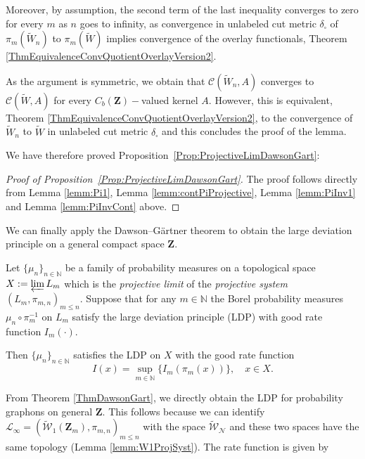 \documentclass[12pt,twoside,a4paper]{article}
\def\N{\mathbb{N}}
\newcommand{\Space}{\mathbf{Z}}
\newcommand{\CbFunct}{C_b(\Space)}
\newcommand{\UGraphon}{\widetilde{\mathcal{W}}_1}
\begin{document}
Moreover, by assumption, the second term of the last inequality converges to zero for every $m$ as $n$ goes to infinity, as convergence in unlabeled cut metric $\delta_{\square}$ of $\pi_m(\widetilde{W}_n)$ to $\pi_m(\widetilde{W})$ implies convergence of the overlay functionals, Theorem \ref{ThmEquivalenceConvQuotientOverlayVersion2}. 

As the argument is symmetric, we obtain that $\mathcal{C}(\widetilde{W}_n,A)$ converges to $\mathcal{C}(\widetilde{W},A)$ for every $\CbFunct-$valued kernel $A.$ However, this is equivalent, Theorem \ref{ThmEquivalenceConvQuotientOverlayVersion2}, to the convergence of $\widetilde{W}_n$ to $\widetilde{W}$ in unlabeled cut metric $\delta_{\square}$ and this concludes the proof of the lemma.
\endproof

We have therefore proved Proposition~\ref{Prop:ProjectiveLimDawsonGart}:

\begin{proof}[Proof of Proposition~\ref{Prop:ProjectiveLimDawsonGart}]
The proof follows directly from Lemma \ref{lemm:Pi1}, Lemma \ref{lemm:contPiProjective}, Lemma \ref{lemm:PiInv1} and Lemma \ref{lemm:PiInvCont} above.
\end{proof}

We can finally apply the Dawson--G\"artner theorem to obtain the large deviation principle on a general compact space $\Space.$ 

\begin{theorem}\label{ThmDawsonGart}
Let $\{\mu_n\}_{n \in\N }$ be a family of probability measures on a topological space $X:=\varprojlim L_m$ which is the \emph{projective limit} of the \emph{projective system}  $(L_m, \pi_{m,n})_{m \leq n}$. Suppose that for any $m \in \N$ the Borel probability measures $\mu_n \circ \pi_m^{-1}$ on $L_m$ satisfy the large deviation principle (LDP) with good rate function $I_m(\cdot)$. 

Then $\{\mu_n\}_{n\in\N }$ satisfies the LDP on $X$ with the good rate function
\[
I(x) = \sup_{m \in \N} \{ I_m(\pi_m(x)) \}, \quad x \in X.
\]
\end{theorem}

From Theorem \ref{ThmDawsonGart}, we directly obtain the LDP for probability graphons on general $\Space$. This follows because we can identify $\mathcal{L}_{\infty}=(\UGraphon(\Space_m), \pi_{m,n})_{m \leq n}$ with the space $\widetilde{\mathcal{W}}_{\mathcal{N}}$ and these two spaces have the same topology (Lemma \ref{lemm:W1ProjSyst}). The rate function is given by
\end{document}
